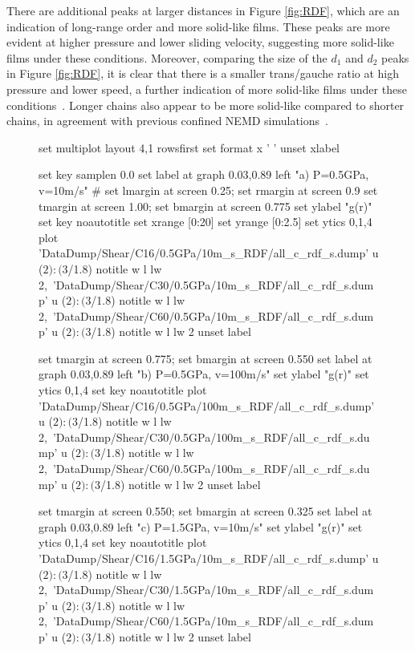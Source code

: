 \documentclass[5p]{elsarticle}
\begin{document}
There are additional peaks at larger distances in Figure \ref{fig:RDF}, which are an indication of long-range order and more solid-like films. These peaks are more evident at higher pressure and lower sliding velocity, suggesting more solid-like films under these conditions. Moreover, comparing the size of the $d_1$ and $d_2$ peaks in Figure \ref{fig:RDF}, it is clear that there is a smaller trans/gauche ratio at high pressure and lower speed, a further indication of more solid-like films under these conditions~\cite{Kavitha2007}. Longer chains also appear to be more solid-like compared to shorter chains, in agreement with previous confined NEMD simulations~\cite{Sivebaek2012}.

\begin{figure}[htp]
    	\begin{center}
		\begin{gnuplot}[terminal=epslatex, terminaloptions={size \SERFigwidth cm, \SERFigheight cm color solid}]
			set multiplot layout 4,1 rowsfirst
			set format x ' '
			unset xlabel

			set key samplen  0.0
			set label at graph 0.03,0.89 left "a) P=0.5GPa, v=10m/s"
#			set lmargin at screen 0.25; set rmargin at screen 0.9
			set tmargin at screen 1.00; set bmargin at screen 0.775
			set ylabel "g(r)"
			set key noautotitle
			set xrange [0:20]
			set yrange [0:2.5]
			set ytics 0,1,4
			plot  	'DataDump/Shear/C16/0.5GPa/10m_s_RDF/all_c_rdf_s.dump' u  ($2):($3/1.8) notitle   w l lw 2,\
		        	'DataDump/Shear/C30/0.5GPa/10m_s_RDF/all_c_rdf_s.dump' u  ($2):($3/1.8) notitle   w l lw 2,\
		        	'DataDump/Shear/C60/0.5GPa/10m_s_RDF/all_c_rdf_s.dump' u  ($2):($3/1.8) notitle   w l lw 2
	    	unset label


			set tmargin at screen 0.775; set bmargin at screen 0.550
			set label at graph 0.03,0.89 left "b) P=0.5GPa, v=100m/s"
			set ylabel "g(r)"
			set ytics 0,1,4
			set key noautotitle
			plot  	'DataDump/Shear/C16/0.5GPa/100m_s_RDF/all_c_rdf_s.dump' u  ($2):($3/1.8) notitle w l lw 2,\
		        	'DataDump/Shear/C30/0.5GPa/100m_s_RDF/all_c_rdf_s.dump' u  ($2):($3/1.8) notitle   w l lw 2,\
		        	'DataDump/Shear/C60/0.5GPa/100m_s_RDF/all_c_rdf_s.dump' u  ($2):($3/1.8) notitle  w l lw 2
	    	unset label



			set tmargin at screen 0.550; set bmargin at screen 0.325
			set label at graph 0.03,0.89 left "c) P=1.5GPa, v=10m/s"
			set ylabel "g(r)"
			set ytics 0,1,4
			set key noautotitle
			plot  	'DataDump/Shear/C16/1.5GPa/10m_s_RDF/all_c_rdf_s.dump' u  ($2):($3/1.8) notitle   w l lw 2,\
		        	'DataDump/Shear/C30/1.5GPa/10m_s_RDF/all_c_rdf_s.dump' u  ($2):($3/1.8) notitle   w l lw 2,\
		        	'DataDump/Shear/C60/1.5GPa/10m_s_RDF/all_c_rdf_s.dump' u  ($2):($3/1.8) notitle   w l lw 2
	    	unset label


\end{gnuplot}
\end{center}
\end{figure}
\end{document}
